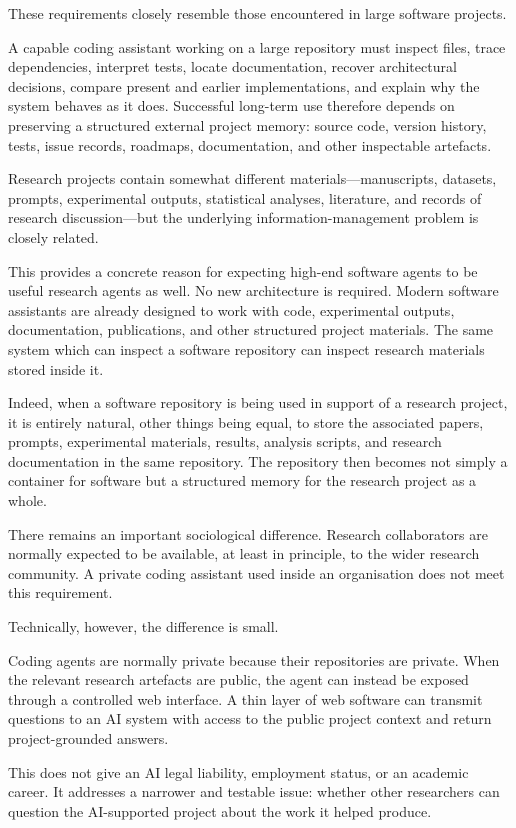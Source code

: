 These requirements closely resemble those encountered in large software projects.

A capable coding assistant working on a large repository must inspect files, trace dependencies, interpret tests, locate documentation, recover architectural decisions, compare present and earlier implementations, and explain why the system behaves as it does. Successful long-term use therefore depends on preserving a structured external project memory: source code, version history, tests, issue records, roadmaps, documentation, and other inspectable artefacts.

Research projects contain somewhat different materials---manuscripts, datasets, prompts, experimental outputs, statistical analyses, literature, and records of research discussion---but the underlying information-management problem is closely related.

This provides a concrete reason for expecting high-end software agents to be useful research agents as well. No new architecture is required. Modern software assistants are already designed to work with code, experimental outputs, documentation, publications, and other structured project materials. The same system which can inspect a software repository can inspect research materials stored inside it.

Indeed, when a software repository is being used in support of a research project, it is entirely natural, other things being equal, to store the associated papers, prompts, experimental materials, results, analysis scripts, and research documentation in the same repository. The repository then becomes not simply a container for software but a structured memory for the research project as a whole.

There remains an important sociological difference. Research collaborators are normally expected to be available, at least in principle, to the wider research community. A private coding assistant used inside an organisation does not meet this requirement.

Technically, however, the difference is small.

Coding agents are normally private because their repositories are private. When the relevant research artefacts are public, the agent can instead be exposed through a controlled web interface. A thin layer of web software can transmit questions to an AI system with access to the public project context and return project-grounded answers.

This does not give an AI legal liability, employment status, or an academic career. It addresses a narrower and testable issue: whether other researchers can question the AI-supported project about the work it helped produce.

